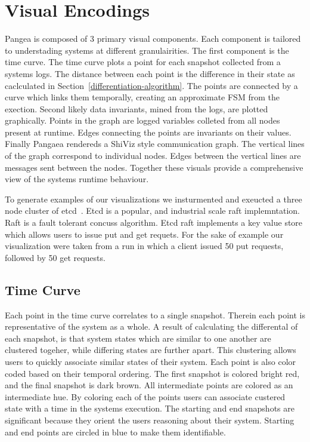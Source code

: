 \section{Visual Encodings}
\label{sec:visual-encodings}

Pangea is composed of 3 primary visual components. Each component is
tailored to understading systems at different granulairities. The
first component is the time curve. The time curve plots a point for
each snapshot collected from a systems logs. The distance between each
point is the difference in their state as caclculated in
Section~\ref{differentiation-algorithm}. The points are connected by a
curve which links them temporally, creating an approximate FSM from
the exection. Second likely data invariants, mined from the logs, are
plotted graphically. Points in the graph are logged variables colleted
from all nodes present at runtime. Edges connecting the points are
invariants on their values. Finally Pangaea rendereds a ShiViz style
communication graph. The vertical lines of the graph correspond to
individual nodes. Edges between the vertical lines are messages sent
between the nodes. Together these visuals provide a comprehensive view
of the systems runtime behaviour.

To generate examples of our visualizations we insturmented and
exeucted a three node cluster of etcd~\cite{etcdraft}. Etcd is a
popular, and industrial scale raft implemntation. Raft is a fault
tolerant concuss algorithm. Etcd raft implements a key value store
which allows users to issue put and get requets. For the sake of
example our visualization were taken from a run in which a client
issued 50 put requests, followed by 50 get requests.

\subsection{Time Curve}


        Each point in the time curve correlates to a single snapshot.
        Therein each point is representative of the system as a whole.
        A result of calculating the differental of each snapshot, is
        that system states which are similar to one another are
        clustered togeher, while differing states are further apart.
        This clustering allows users to quickly associate similar
        states of their system. Each point is also color coded based
        on their temporal ordering. The first snapshot is colored
        bright red, and the final snapshot is dark brown. All
        intermediate points are colored as an intermediate hue. By
        coloring each of the points users can associate custered state
        with a time in the systems execution. The starting and end
        snapshots are significant because they orient the users
        reasoning about their system. Starting and end points are
        circled in blue to make them identifiable.

